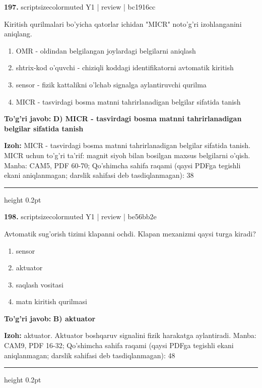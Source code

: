 \documentclass[10pt,a4paper]{article}
\begin{document}
{\bfseries\sffamily\color{ink} 197.} {scriptsizecolor{muted} Y1 | review | bc1916cc}
\par
Kiritish qurilmalari bo'yicha qatorlar ichidan "MICR" noto'g'ri izohlanganini aniqlang.
\begin{enumerate}[label=\Alph*),leftmargin=9mm]
\item OMR - oldindan belgilangan joylardagi belgilarni aniqlash
\item shtrix-kod o'quvchi - chiziqli koddagi identifikatorni avtomatik kiritish
\item sensor - fizik kattalikni o'lchab signalga aylantiruvchi qurilma
\item MICR - tasvirdagi bosma matnni tahrirlanadigan belgilar sifatida tanish
\end{enumerate}
\begin{tcolorbox}[enhanced,breakable,colback=teal!4,colframe=teal!60!black,boxrule=0.45pt,arc=1.2mm,left=2.7mm,right=2.7mm,top=1.8mm,bottom=1.8mm,before skip=2mm,after skip=2mm]
{\bfseries\sffamily\color{teal}To'g'ri javob:} \textbf{D) MICR - tasvirdagi bosma matnni tahrirlanadigan belgilar sifatida tanish}
\par\smallskip
{\bfseries Izoh:} MICR - tasvirdagi bosma matnni tahrirlanadigan belgilar sifatida tanish. MICR uchun to'g'ri ta'rif: magnit siyoh bilan bosilgan maxsus belgilarni o'qish. Manba: CAM5, PDF 60-70; Qo'shimcha sahifa raqami (qaysi PDFga tegishli ekani aniqlanmagan; darslik sahifasi deb tasdiqlanmagan): 38
\end{tcolorbox}
\vspace{2mm}\hrule height 0.2pt\vspace{3mm}

{\bfseries\sffamily\color{ink} 198.} {scriptsizecolor{muted} Y1 | review | be56bb2e}
\par
Avtomatik sug'orish tizimi klapanni ochdi. Klapan mexanizmi qaysi turga kiradi?
\begin{enumerate}[label=\Alph*),leftmargin=9mm]
\item sensor
\item aktuator
\item saqlash vositasi
\item matn kiritish qurilmasi
\end{enumerate}
\begin{tcolorbox}[enhanced,breakable,colback=teal!4,colframe=teal!60!black,boxrule=0.45pt,arc=1.2mm,left=2.7mm,right=2.7mm,top=1.8mm,bottom=1.8mm,before skip=2mm,after skip=2mm]
{\bfseries\sffamily\color{teal}To'g'ri javob:} \textbf{B) aktuator}
\par\smallskip
{\bfseries Izoh:} aktuator. Aktuator boshqaruv signalini fizik harakatga aylantiradi. Manba: CAM9, PDF 16-32; Qo'shimcha sahifa raqami (qaysi PDFga tegishli ekani aniqlanmagan; darslik sahifasi deb tasdiqlanmagan): 48
\end{tcolorbox}
\vspace{2mm}\hrule height 0.2pt\vspace{3mm}
\end{document}
